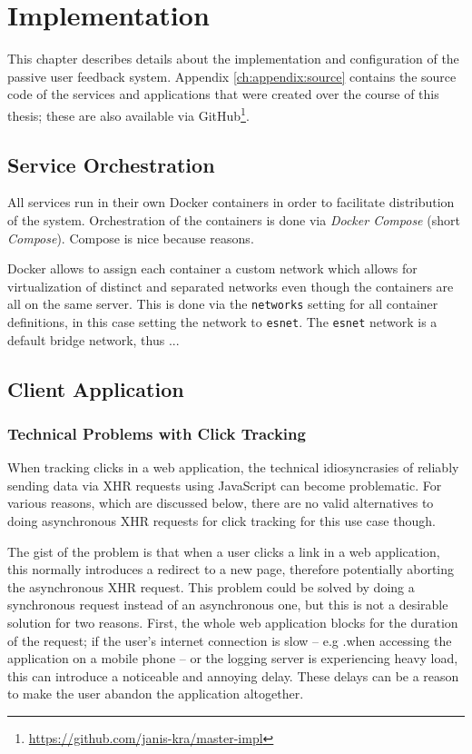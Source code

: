 %
\chapter{Implementation}
\label{ch:implementation}

This chapter describes details about the implementation and configuration of the passive user feedback system.
Appendix \cref{ch:appendix:source} contains the source code of the services and applications that were created over the course of this thesis; these are also available via GitHub\footnote{\url{https://github.com/janis-kra/master-impl}}.

\section{Service Orchestration}
\label{sec:implementation:orchestration}

All services run in their own Docker containers in order to facilitate distribution of the system.
Orchestration of the containers is done via \emph{Docker Compose} (short \emph{Compose}).
Compose is nice because reasons.

Docker allows to assign each container a custom network which allows for virtualization of distinct and separated networks even though the containers are all on the same server.
This is done via the \texttt{networks} setting for all container definitions, in this case setting the network to \texttt{esnet}.
The \texttt{esnet} network is a default bridge network, thus ...

\section{Client Application}
\label{sec:implementation:client}

\subsection{Technical Problems with Click Tracking}

When tracking clicks in a web application, the technical idiosyncrasies of reliably sending data via \ac{XHR} requests using JavaScript can become problematic.
For various reasons, which are discussed below, there are no valid alternatives to doing asynchronous \ac{XHR} requests for click tracking for this use case though.

The gist of the problem is that when a user clicks a link in a web application, this normally introduces a redirect to a new page, therefore potentially aborting the asynchronous \ac{XHR} request\cite{Kohavi2010}.
This problem could be solved by doing a synchronous request instead of an asynchronous one, but this is not a desirable solution for two reasons.
First, the whole web application blocks for the duration of the request; if the user's internet connection is slow -- e.g .when accessing the application on a mobile phone -- or the logging server is experiencing heavy load, this can introduce a noticeable and annoying delay.
These delays can be a reason to make the user abandon the application altogether\cite{Kohavi2010,Dmitriev2017}.

